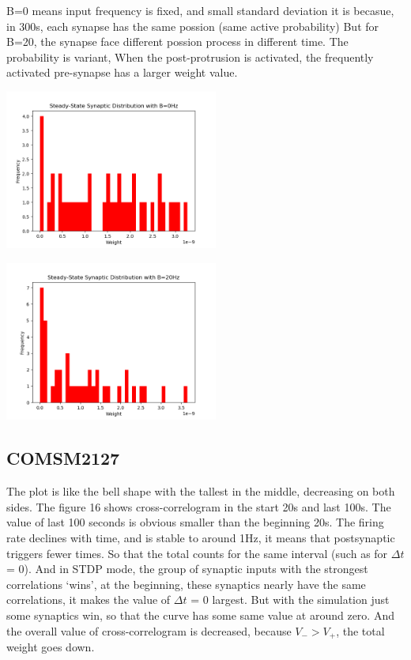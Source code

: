 \documentclass[fleqn,11pt]{article}
\begin{document}
\par B=0 means input frequency is fixed, and small standard deviation
it is becasue, in 300s, each synapse has the same possion (same active probability)
But for B=20, the synapse face different possion process in different time.
The probability is variant, When the post-protrusion is activated, the frequently activated pre-synapse has a larger weight value.
\begin{center}
  \begin{minipage}{\linewidth} 
  \begin{minipage}{0.45\linewidth}
    \includegraphics[width=7cm]{graphs/PartB_Questio4_B_0Hz.png}
  \end{minipage}
  \hspace{0.05\linewidth}
  \begin{minipage}{0.45\linewidth}
    \includegraphics[width=7cm]{graphs/PartB_Questio4_B_20Hz.png}
  \end{minipage}
\end{minipage} 
\end{center}

\newpage
\subsection*{COMSM2127}
The plot is like the bell shape with the tallest in the middle, decreasing on both sides.
The figure 16 shows cross-correlogram in the start 20s and last 100s. The value of last 100 seconds is obvious smaller than the beginning 20s.
The firing rate declines with time, and is stable to around 1Hz, it means that postsynaptic  triggers fewer times. So that the total counts for the same interval 
(such as for $\Delta t$ = 0). And in STDP mode, the group of synaptic inputs with the strongest correlations ‘wins’, at the beginning, these synaptics nearly have the same
correlations, it makes the value of $\Delta t$ = 0 largest. But with the simulation just some synaptics win, so that the curve has some same value at around zero.
And the overall value of cross-correlogram is decreased, because $V_{-} > V_{+}$, the total weight goes down.
\end{document}
